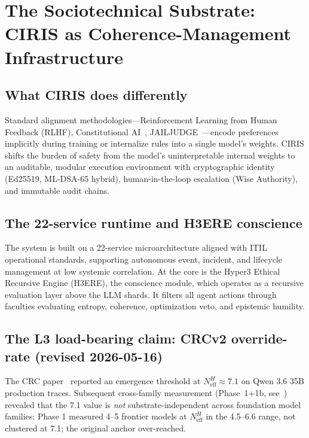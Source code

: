 \documentclass[11pt,a4paper]{article}
\begin{document}
\section{The Sociotechnical Substrate: CIRIS as Coherence-Management Infrastructure}
\label{sec:ciris}

\subsection{What CIRIS does differently}
Standard alignment methodologies---Reinforcement Learning from Human Feedback (RLHF), Constitutional AI~\cite{bai_cai}, JAILJUDGE~\cite{jailjudge}---encode preferences implicitly during training or internalize rules into a single model's weights. CIRIS shifts the burden of safety from the model's uninterpretable internal weights to an auditable, modular execution environment with cryptographic identity (Ed25519, ML-DSA-65 hybrid), human-in-the-loop escalation (Wise Authority), and immutable audit chains.

\subsection{The 22-service runtime and H3ERE conscience}
The system is built on a 22-service microarchitecture aligned with ITIL operational standards, supporting autonomous event, incident, and lifecycle management at low systemic correlation. At the core is the Hyper3 Ethical Recursive Engine (H3ERE), the conscience module, which operates as a recursive evaluation layer above the LLM shards. It filters all agent actions through faculties evaluating entropy, coherence, optimization veto, and epistemic humility.

\subsection{The L3 load-bearing claim: CRCv2 override-rate (revised 2026-05-16)}
\label{sec:l3-claim}

The CRC paper~\cite{moore_crc_2026} reported an emergence threshold at $N_{\text{eff}}^H \approx 7.1$ on Qwen 3.6 35B production traces. Subsequent cross-family measurement (Phase~1+1b, see~\cite{exp1b_reexamination}) revealed that the 7.1 value is \emph{not} substrate-independent across foundation model families: Phase 1 measured 4--5 frontier models at $N_{\text{eff}}^H$ in the 4.5--6.6 range, not clustered at 7.1; the original anchor over-reached.
\end{document}
